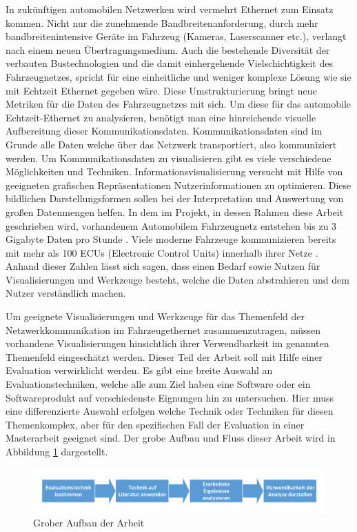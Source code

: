 \documentclass[draft=false
              ,paper=a4
              ,twoside=false
              ,fontsize=11pt
              ,headsepline
              ,BCOR10mm
              ,DIV11
              ]{scrbook}
\begin{document}
In zukünftigen automobilen Netzwerken wird vermehrt Ethernet zum Einsatz kommen. Nicht nur die zunehmende Bandbreitenanforderung, durch mehr bandbreitenintensive Geräte im Fahrzeug (Kameras, Laserscanner etc.), verlangt nach einem neuen Übertragungsmedium. Auch die bestehende Diversität der verbauten Bustechnologien und die damit einhergehende Vielschichtigkeit des Fahrzeugnetzes, spricht für eine einheitliche und weniger komplexe Lösung wie sie mit Echtzeit Ethernet gegeben wäre. Diese Umstrukturierung bringt neue Metriken für die Daten des Fahrzeugnetzes mit sich. Um diese für das automobile Echtzeit-Ethernet zu analysieren, benötigt man eine hinreichende visuelle Aufbereitung dieser Kommunikationsdaten. Kommunikationsdaten sind im Grunde alle Daten welche über das Netzwerk transportiert, also kommuniziert werden. Um Kommunikationsdaten zu visualisieren gibt es viele verschiedene Möglichkeiten und Techniken. Informationsvisualisierung versucht mit Hilfe von geeigneten grafischen Repräsentationen Nutzerinformationen zu optimieren. Diese bildlichen Darstellungsformen sollen bei der Interpretation und Auswertung von großen Datenmengen helfen. In dem im Projekt, in dessen Rahmen diese Arbeit geschrieben wird, vorhandenem Automobilem Fahrzeugnetz entstehen bis zu 3 Gigabyte Daten pro Stunde \cite{core_2017}. Viele moderne Fahrzeuge kommunizieren bereits mit mehr als 100 ECUs (Electronic Control Units) innerhalb ihrer Netze \cite{broy_cross-layer_2011}. Anhand dieser Zahlen lässt sich sagen, dass einen Bedarf sowie Nutzen für Visualisierungen und Werkzeuge besteht, welche die Daten abstrahieren und dem Nutzer verständlich machen.

Um geeignete Visualisierungen und Werkzeuge für das Themenfeld der Netzwerkkommunikation im Fahrzeugethernet zusammenzutragen, müssen vorhandene Visualisierungen hinsichtlich ihrer Verwendbarkeit im genannten Themenfeld eingeschätzt werden. Dieser Teil der Arbeit soll mit Hilfe einer Evaluation verwirklicht werden. Es gibt eine breite Auswahl an Evaluationstechniken, welche alle zum Ziel haben eine Software oder ein Softwareprodukt auf verschiedenste Eignungen hin zu untersuchen. Hier muss eine differenzierte Auswahl erfolgen welche Technik oder Techniken für diesen Themenkomplex, aber für den spezifischen Fall der Evaluation in einer Masterarbeit geeignet sind. Der grobe Aufbau und Fluss dieser Arbeit wird in Abbildung \ref{fig:aufbaugrob} dargestellt. 

\begin{figure}[htbp]
  \centering
  \includegraphics[width=\textwidth]{img/Aufbau_grob.pdf}
  \caption{Grober Aufbau der Arbeit}
  \label{fig:aufbaugrob}
\end{figure}
\end{document}
